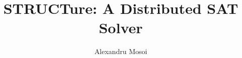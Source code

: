 \documentclass[a4paper]{report}
\begin{document}
\title{STRUCTure: A Distributed SAT Solver}
\author{Alexandru Mosoi}

\maketitle
\tableofcontents






\end{document}
